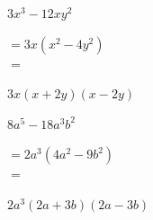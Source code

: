 \begin{tasks}
    \task \begin{exercise}$3x^3-12xy^2$
              \begin{envSolution}
                 $ =3x(x^2-4y^2)   $\\
                 $ = $				 
                     \begin{shortsolution}
  	                    $ 3x(x+2y)(x-2y)$
                     \end{shortsolution}
              \end{envSolution}%
          \end{exercise}

    \task \begin{exercise}$8a^5-18a^3b^2$
              \begin{envSolution}
                 $ =2a^3(4a^2-9b^2)   $\\
                 $ = $				 
                     \begin{shortsolution}
  	                    $2a^3(2a+3b)(2a-3b)$
                     \end{shortsolution}
              \end{envSolution}%
          \end{exercise}
\end{tasks}

\clearpage



